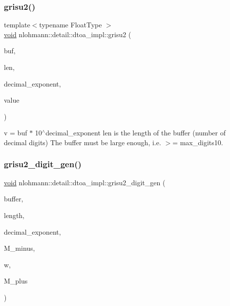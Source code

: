 \subsubsection{\texorpdfstring{grisu2()}{grisu2()}\hspace{0.1cm}{\footnotesize\ttfamily [2/2]}}
{\footnotesize\ttfamily template$<$typename Float\+Type $>$ \\
\hyperlink{namespacenlohmann_1_1detail_a59fca69799f6b9e366710cb9043aa77d}{void} nlohmann\+::detail\+::dtoa\+\_\+impl\+::grisu2 (\begin{DoxyParamCaption}\item[{char $\ast$}]{buf,  }\item[{int \&}]{len,  }\item[{int \&}]{decimal\+\_\+exponent,  }\item[{Float\+Type}]{value }\end{DoxyParamCaption})}

v = buf $\ast$ 10$^\wedge$decimal\+\_\+exponent len is the length of the buffer (number of decimal digits) The buffer must be large enough, i.\+e. $>$= max\+\_\+digits10. \mbox{\label{namespacenlohmann_1_1detail_1_1dtoa__impl_a9b899c72b0e1e3dd46d75c2b4e6bcdfb}} 
\subsubsection{\texorpdfstring{grisu2\+\_\+digit\+\_\+gen()}{grisu2\_digit\_gen()}}
{\footnotesize\ttfamily \hyperlink{namespacenlohmann_1_1detail_a59fca69799f6b9e366710cb9043aa77d}{void} nlohmann\+::detail\+::dtoa\+\_\+impl\+::grisu2\+\_\+digit\+\_\+gen (\begin{DoxyParamCaption}\item[{char $\ast$}]{buffer,  }\item[{int \&}]{length,  }\item[{int \&}]{decimal\+\_\+exponent,  }\item[{\hyperlink{structnlohmann_1_1detail_1_1dtoa__impl_1_1diyfp}{diyfp}}]{M\+\_\+minus,  }\item[{\hyperlink{structnlohmann_1_1detail_1_1dtoa__impl_1_1diyfp}{diyfp}}]{w,  }\item[{\hyperlink{structnlohmann_1_1detail_1_1dtoa__impl_1_1diyfp}{diyfp}}]{M\+\_\+plus }\end{DoxyParamCaption})\hspace{0.3cm}{\ttfamily [inline]}}

